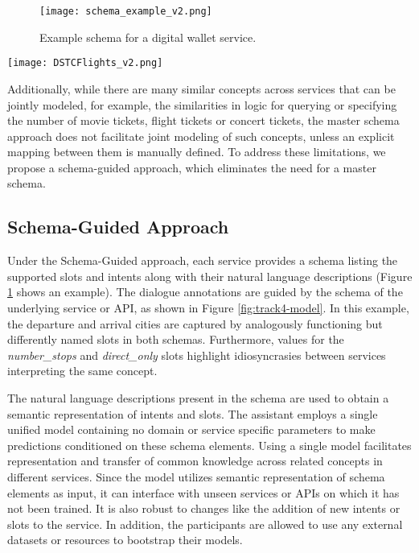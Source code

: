 \begin{figure}[ht]
\centering
\texttt{[image: schema\_example\_v2.png]}
\caption{Example schema for a digital wallet service.}
\label{fig:schema-example}
\end{figure}

\begin{figure*}[ht]
    \centering
    \texttt{[image: DSTCFlights\_v2.png]}
    \caption{Dialogue state tracking labels after each user utterance in a  dialogue in the context of two different flight services. Under the schema-guided approach, the annotations are conditioned on the schema (extreme left/right) of the underlying service.}
    \label{fig:track4-model}
\end{figure*}

Additionally, while there are many similar concepts across services that can be jointly modeled, for example, the similarities in logic for querying or specifying the number of movie tickets, flight tickets or concert tickets, the master schema approach does not facilitate joint modeling of such concepts, unless an explicit mapping between them is manually defined. To address these limitations, we propose a schema-guided approach, which eliminates the need for a master schema.

\subsection{Schema-Guided Approach}

Under the Schema-Guided approach, each service provides a schema listing the supported slots and intents along with their natural language descriptions (Figure \ref{fig:schema-example} shows an example). The dialogue annotations are guided by the schema of the underlying service or API, as shown in Figure \ref{fig:track4-model}. In this example, the departure and arrival cities are captured by analogously functioning but differently named slots in both schemas. Furthermore, values for the \textit{number\_stops} and \textit{direct\_only} slots highlight idiosyncrasies between services interpreting the same concept.

The natural language descriptions present in the schema are used to obtain a semantic representation of intents and slots. The assistant employs a single unified model containing no domain or service specific parameters to make predictions conditioned on these schema elements. Using a single model facilitates representation and transfer of common knowledge across related concepts in different services. Since the model utilizes semantic representation of schema elements as input, it can interface with unseen services or APIs on which it has not been trained. It is also robust to changes like the addition of new intents or slots to the service. In addition, the participants are allowed to use any external datasets or resources to bootstrap their models.

